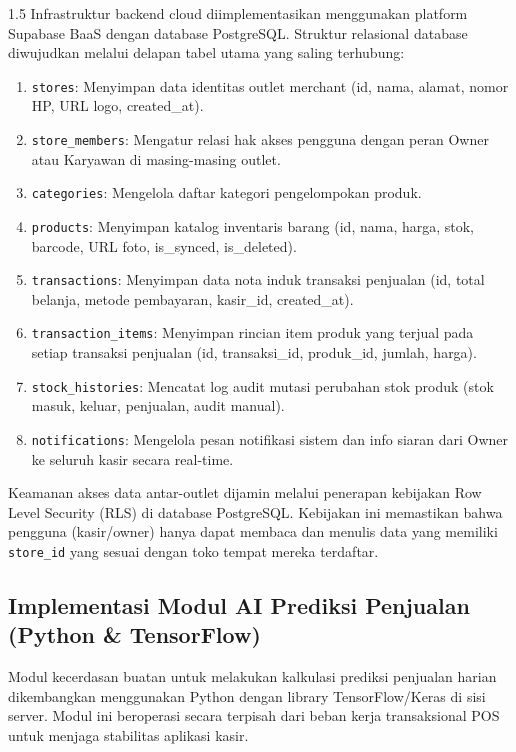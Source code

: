 \documentclass[12pt, a4paper, onecolumn, oneside]{report}
\begin{document}
\begin{spacing}{1.5}
Infrastruktur backend cloud diimplementasikan menggunakan platform Supabase BaaS dengan database PostgreSQL. Struktur relasional database diwujudkan melalui delapan tabel utama yang saling terhubung:
\begin{enumerate}
    \item \texttt{stores}: Menyimpan data identitas outlet merchant (id, nama, alamat, nomor HP, URL logo, created\_at).
    \item \texttt{store\_members}: Mengatur relasi hak akses pengguna dengan peran Owner atau Karyawan di masing-masing outlet.
    \item \texttt{categories}: Mengelola daftar kategori pengelompokan produk.
    \item \texttt{products}: Menyimpan katalog inventaris barang (id, nama, harga, stok, barcode, URL foto, is\_synced, is\_deleted).
    \item \texttt{transactions}: Menyimpan data nota induk transaksi penjualan (id, total belanja, metode pembayaran, kasir\_id, created\_at).
    \item \texttt{transaction\_items}: Menyimpan rincian item produk yang terjual pada setiap transaksi penjualan (id, transaksi\_id, produk\_id, jumlah, harga).
    \item \texttt{stock\_histories}: Mencatat log audit mutasi perubahan stok produk (stok masuk, keluar, penjualan, audit manual).
    \item \texttt{notifications}: Mengelola pesan notifikasi sistem dan info siaran dari Owner ke seluruh kasir secara real-time.
\end{enumerate}

Keamanan akses data antar-outlet dijamin melalui penerapan kebijakan Row Level Security (RLS) di database PostgreSQL. Kebijakan ini memastikan bahwa pengguna (kasir/owner) hanya dapat membaca dan menulis data yang memiliki \texttt{store\_id} yang sesuai dengan toko tempat mereka terdaftar.

\subsection{Implementasi Modul AI Prediksi Penjualan (Python \& TensorFlow)}

Modul kecerdasan buatan untuk melakukan kalkulasi prediksi penjualan harian dikembangkan menggunakan Python dengan library TensorFlow/Keras di sisi server. Modul ini beroperasi secara terpisah dari beban kerja transaksional POS untuk menjaga stabilitas aplikasi kasir.


\end{spacing}
\end{document}
